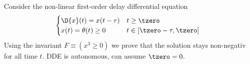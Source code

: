             Consider the non-linear first-order delay differential equation
            \begin{equation}
                \begin{cases}
                    \D{x}(t) = x(t-\tau) & t \geq \tzero\\
                    x(t) = \theta(t)\geq 0 & t \in [\tzero-\tau,\tzero]
                \end{cases}
            \end{equation}
            Using the invariant $F\equiv(x^3\geq 0)$ we prove that the solution stays non-negativ for all time $t$.
            DDE is autonomous, can assume $\tzero=0$.
            \footnotesize
            \begin{sequentdeduction}
            \end{sequentdeduction}
